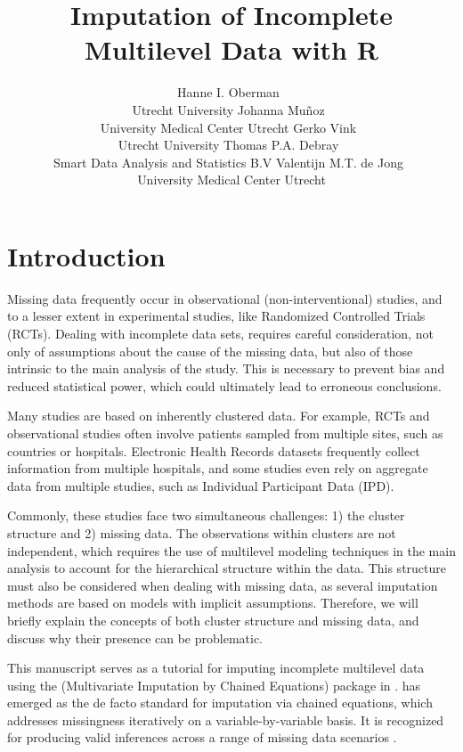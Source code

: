 \documentclass[
  article]{jss}
\author{Hanne I.
Oberman\footnotemark[1]~\orcidlink{0000-0003-3276-2141}\\Utrecht
University \And Johanna
Muñoz\footnotemark[1]~\orcidlink{0000-0002-2384-5415}\\University
Medical Center Utrecht \AND Gerko
Vink~\orcidlink{0000-0001-9767-1924}\\Utrecht University \And Thomas
P.A. Debray~\orcidlink{0000-0002-1790-2719}\\Smart Data Analysis and
Statistics B.V \AND Valentijn M.T. de
Jong~\orcidlink{0000-0001-9921-3468}\\University Medical Center Utrecht}
\title{Imputation of Incomplete Multilevel Data with R}
\begin{document}
\maketitle


\section{Introduction}\label{sec-intro}

Missing data frequently occur in observational (non-interventional)
studies, and to a lesser extent in experimental studies, like Randomized
Controlled Trials (RCTs). Dealing with incomplete data sets, requires
careful consideration, not only of assumptions about the cause of the
missing data, but also of those intrinsic to the main analysis of the
study. This is necessary to prevent bias and reduced statistical power,
which could ultimately lead to erroneous conclusions.

\renewcommand*{\thefootnote}{\fnsymbol{footnote}}


\renewcommand*{\thefootnote}{\arabic{footnote}}

Many studies are based on inherently clustered data. For example, RCTs
and observational studies often involve patients sampled from multiple
sites, such as countries or hospitals. Electronic Health Records
datasets frequently collect information from multiple hospitals, and
some studies even rely on aggregate data from multiple studies, such as
Individual Participant Data (IPD).

Commonly, these studies face two simultaneous challenges: 1) the cluster
structure and 2) missing data. The observations within clusters are not
independent, which requires the use of multilevel modeling techniques in
the main analysis to account for the hierarchical structure within the
data. This structure must also be considered when dealing with missing
data, as several imputation methods are based on models with implicit
assumptions. Therefore, we will briefly explain the concepts of both
cluster structure and missing data, and discuss why their presence can
be problematic.

This manuscript serves as a tutorial for imputing incomplete multilevel
data using the  (Multivariate Imputation by Chained Equations)
package in .  has emerged as the de facto standard
for imputation via chained equations, which addresses missingness
iteratively on a variable-by-variable basis. It is recognized for
producing valid inferences across a range of missing data scenarios
\citep{buur18}.
\end{document}
